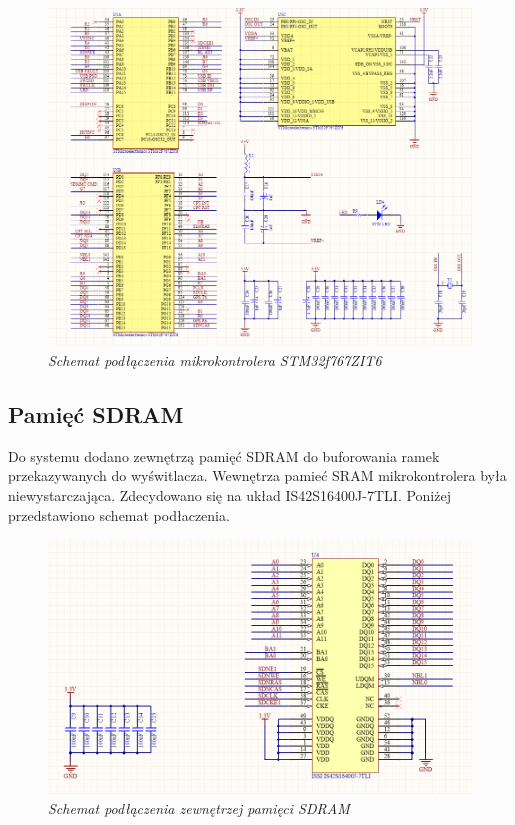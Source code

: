 \documentclass[eng,printmode]{mgr}
\begin{document}
\begin{figure}[!h]
    \centering
    \includegraphics[height=\textwidth, angle=90]{schematics/uC.png}
    \caption{\textit{\scriptsize Schemat podłączenia mikrokontrolera STM32f767ZIT6}}
\end{figure}

\subsection{Pamięć SDRAM}
Do systemu dodano zewnętrzą pamięć SDRAM do buforowania ramek przekazywanych do wyświtlacza. Wewnętrza pamieć SRAM mikrokontrolera była niewystarczająca. Zdecydowano się na układ IS42S16400J-7TLI. Poniżej przedstawiono schemat podłaczenia.

\begin{figure}[!h]
    \centering
    \includegraphics[width=\textwidth]{schematics/sdram.png}
    \caption{\textit{\scriptsize Schemat podłączenia zewnętrzej pamięci SDRAM}}
\end{figure}
\end{document}
